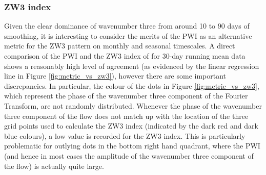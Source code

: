 \subsubsection{ZW3 index}

Given the clear dominance of wavenumber three from around 10 to 90 days of smoothing, it is interesting to consider the merits of the PWI as an alternative metric for the ZW3 pattern on monthly and seasonal timescales. A direct comparison of the PWI and the ZW3 index of \citet{Raphael2004} for 30-day running mean data shows a reasonably high level of agreement (as evidenced by the linear regression line in Figure \ref{fig:metric_vs_zw3}), however there are some important discrepancies. In particular, the colour of the dots in Figure \ref{fig:metric_vs_zw3}, which represent the phase of the wavenumber three component of the Fourier Transform, are not randomly distributed. Whenever the phase of the wavenumber three component of the flow does not match up with the location of the three grid points used to calculate the ZW3 index (indicated by the dark red and dark blue colours), a low value is recorded for the ZW3 index. This is particularly problematic for outlying dots in the bottom right hand quadrant, where the PWI (and hence in most cases the amplitude of the wavenumber three component of the flow) is actually quite large.      